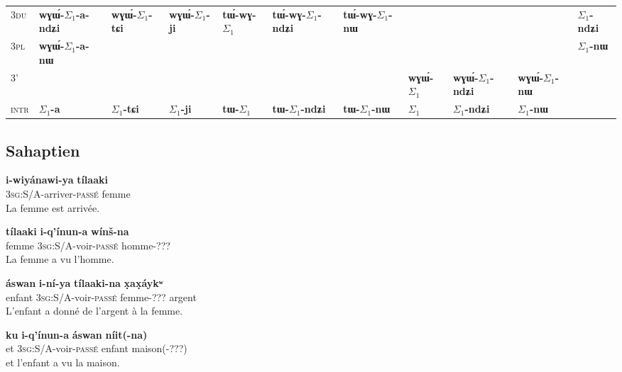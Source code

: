 \documentclass[oldfontcommands,twoside,a4paper,12pt]{article}
\newcommand{\ipa}[1]{{\phon\textbf{#1}}}
\newcommand{\siga}{$\Sigma_1$}
\newcommand{\grise}[1]{\cellcolor{lightgray}\textbf{#1}}
\begin{document}
\begin{landscape}
\begin{table}[H]
{\begin{tabular}{l|l|l|l|l|l|l|l|l|l|l|}
\cline{2-2}
\cline{11-11}
\textsc{3du} &  	\ipa{wɣɯ́-\siga{}-a-ndʑi} & 	 \ipa{wɣɯ́-\siga{}-tɕi} & 		\ipa{wɣɯ́-\siga{}-ji} & 	\ipa{tɯ́-wɣ-\siga{}} & 	\ipa{tɯ́-wɣ-\siga{}-ndʑi} & 	\ipa{tɯ́-wɣ-\siga{}-nɯ} & 	\multicolumn{3}{c|}{\grise{}} &	\ipa{\siga{}-ndʑi} \\ 
\cline{2-2}	
\cline{11-11}
\textsc{3pl} &  	\ipa{wɣɯ́-\siga{}-a-nɯ} & 	\ipa{} & 	\ipa{} & 	\ipa{} & 	\ipa{} & 	\ipa{} & \multicolumn{3}{c|}{\grise{}} &	\ipa{\siga{}-nɯ} \\ 	
\hline
\textsc{3'} & 	\multicolumn{6}{c|}{\grise{}} &	\ipa{wɣɯ́-\siga{}} & 	\ipa{wɣɯ́-\siga{}-ndʑi} & 	\ipa{wɣɯ́-\siga{}-nɯ} & 	\grise{} \\	
	\hline	\hline
\textsc{intr}&\ipa{\siga{}-a}&\ipa{\siga{}-tɕi}&\ipa{\siga{}-ji}&\ipa{tɯ-\siga{}}&\ipa{tɯ-\siga{}-ndʑi}&\ipa{tɯ-\siga{}-nɯ}&\ipa{\siga{}}&\ipa{\siga{}-ndʑi} &\ipa{\siga{}-nɯ}& 	\grise{} \\	
	\hline
\end{tabular}}
\end{table}


\begin{multicols}{2}

\section{Sahaptien}

 \begin{exe}
\ex 
\gll
\ipa{i-wiyánawi-ya}  	\ipa{tílaaki}  \\
\textsc{3sg}:S/A-arriver-\textsc{passé} femme \\
\glt La femme est arrivée.
\end{exe}

 \begin{exe}
\ex 
\gll
\ipa{tílaaki}  	\ipa{i-q'ínun-a}  	\ipa{wínš-na}   \\
		femme \textsc{3sg}:S/A-voir-\textsc{passé} homme-??? \\
\glt La femme a vu l'homme.
\end{exe}

 \begin{exe}
\ex 
\gll
 \ipa{áswan}    	\ipa{i-ní-ya}  \ipa{tílaaki-na} 	\ipa{x̣ax̣áykʷ}   \\
		enfant \textsc{3sg}:S/A-voir-\textsc{passé} femme-??? argent \\
\glt L'enfant a donné de l'argent à la femme.
\end{exe}


 \begin{exe}
\ex 
\gll
\ipa{ku}  	\ipa{i-q'ínun-a}  \ipa{áswan}  	\ipa{níit(-na)}   \\
		et \textsc{3sg}:S/A-voir-\textsc{passé} enfant maison(-???) \\
\glt  et l'enfant a vu la maison.
\end{exe}


\end{multicols}
\end{landscape}
\end{document}
